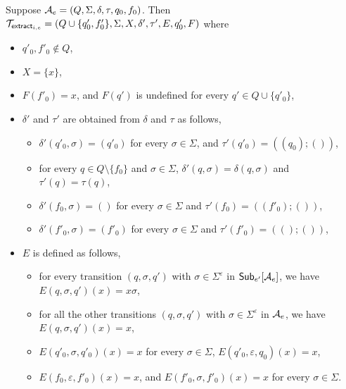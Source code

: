 Suppose $\mathcal{A}_e = (Q, \Sigma, \delta, \tau, q_0, f_0)$. Then $\mathcal{T}_{\mathsf{extract}_{i,e}} = (Q \cup \{q'_0, f'_0\}, \Sigma, X, \delta', \tau', E, q'_0, F)$ where
\begin{itemize}
\item $q'_0, f'_0 \not \in Q$,

\item  $X = \{x\}$,
%
\item $F(f'_0) = x$, and $F(q')$ is undefined for every $q' \in Q \cup \{q'_0\}$,

\item $\delta'$ and $\tau'$ are obtained from $\delta$ and $\tau$ as follows,
\begin{itemize}
\item $\delta'(q'_0, \sigma) = (q'_0)$ for every $\sigma \in \Sigma$, and $\tau'(q'_0) = ((q_0); ())$,
%
\item  for every $q \in Q \setminus \{f_0\}$ and $\sigma \in \Sigma$, $\delta'(q, \sigma) = \delta(q, \sigma)$ and $\tau'(q) = \tau(q)$, 
%
\item $\delta'(f_0, \sigma) = ()$ for every $\sigma \in \Sigma$ and $\tau'(f_0) = ((f'_0); ())$,
%
\item $\delta'(f'_0, \sigma) = (f'_0)$ for every $\sigma \in \Sigma$ and $\tau'(f'_0) = ((); ())$,
\end{itemize}
%
\item $E$ is defined as follows, 
\begin{itemize}
\item for every transition $(q, \sigma, q')$ with  $\sigma \in \Sigma^\varepsilon$ in ${\sf Sub}_{e'}[\mathcal{A}_e]$, we have $E(q, \sigma, q')(x) = x\sigma$, 
\item for all the other transitions $(q, \sigma, q')$ with $\sigma \in \Sigma^\varepsilon$ in $\mathcal{A}_e$, we have $E(q, \sigma, q')(x) = x$, 
\item $E(q'_0, \sigma, q'_0)(x) = x$ for every $\sigma \in \Sigma$, $E(q'_0, \varepsilon, q_0)(x) = x$, 
\item $E(f_0, \varepsilon, f'_0)(x) = x$, and $E(f'_0, \sigma, f'_0)(x) = x$ for every $\sigma \in \Sigma$.
\end{itemize}
%
\end{itemize}




